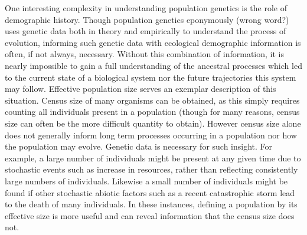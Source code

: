 One interesting complexity in understanding population genetics is the role of demographic history. Though population genetics eponymously (\color{red}wrong word?\color{black}) uses genetic data both in theory and empirically to understand the process of evolution, informing such genetic data with ecological demographic information is often, if not always, necessary. Without this combination of information, it is nearly impossible to gain a full understanding of the ancestral processes which led to the current state of a biological system nor the future trajectories this system may follow. Effective population size serves an exemplar description of this situation. Census size of many organisms can be obtained, as this simply requires counting all individuals present in a population (though for many reasons, census size can often be the more difficult quantity to obtain). However census size alone does not generally inform long term processes occurring in a population nor how the population may evolve. Genetic data is necessary for such insight. For example, a large number of individuals might be present at any given time due to stochastic events such as increase in resources, rather than reflecting consistently large numbers of individuals. Likewise a small number of individuals might be found if other stochastic abiotic factors such as a recent catastrophic storm lead to the death of many individuals. In these instances, defining a population by its effective size is more useful and can reveal information that the census size does not. 

